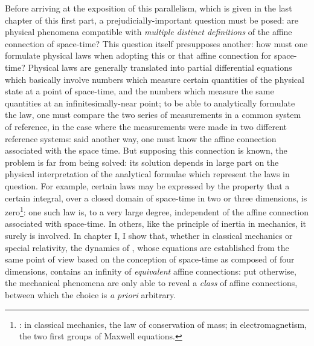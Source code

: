 \documentclass{report}
\begin{document}
Before arriving at the exposition of this parallelism, which is given in the last chapter of this first part, a prejudicially-important question must be posed: are physical phenomena compatible with \textit{multiple distinct definitions} of the affine connection of space-time? This question itself presupposes another: how must one formulate physical laws when adopting this or that affine connection for space-time? Physical laws are generally translated into partial differential equations which basically involve numbers which measure certain quantities of the physical state at a point of space-time, and the numbers which measure the same quantities at an infinitesimally-near point; to be able to analytically formulate the law, one must compare the two series of measurements in a common system of reference, in the case where the measurements were made in two different reference systems: said another way, one must know the affine connection associated with the space time. But supposing this connection is known, the problem is far from being solved: its solution depends in large part on the physical interpretation of the analytical formulae which represent the laws in question. For example, certain laws may be expressed by the property that a certain integral, over a closed domain of space-time in two or three dimensions, is zero\footnote{: in classical mechanics, the law of conservation of mass; in electromagnetism, the two first groups of Maxwell equations.}: one such law is, to a very large degree, independent of the affine connection associated with space-time. In others, like the principle of inertia in mechanics, it surely is involved. In chapter I, I show that, whether in classical mechanics or special relativity, the dynamics of , whose equations are established from the same point of view based on the conception of space-time as composed of four dimensions, contains an infinity of \textit{equivalent} affine connections: put otherwise, the mechanical phenomena are only able to reveal a \textit{class} of affine connections, between which the choice is \textit{a priori} arbitrary.
\end{document}
